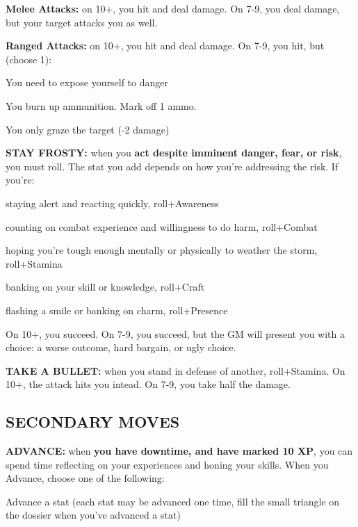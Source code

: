 \documentclass[oneside,10pt]{article}
\begin{document}
\begin{multicols}{2}
\begin{adjustwidth*}{.5cm}{.5cm}
\textbf{Melee Attacks:} on 10+, you hit and deal damage. On 7-9,
you deal damage, but your target attacks you as
well.

\textbf{Ranged Attacks:} on 10+, you hit and deal damage. On
7-9, you hit, but (choose 1):
\begin{adjustwidth*}{.5cm}{.5cm}

\tcirc{} You need to expose yourself to danger

\tcirc{} You burn up ammunition. Mark off 1 ammo.

\tcirc{} You only graze the target (-2 damage)
\end{adjustwidth*}
\end{adjustwidth*}

\textbf{STAY FROSTY:} when you \textbf{act despite imminent danger,
fear, or risk}, you must roll. The stat you add depends on
how you’re addressing the risk. If you’re:
\begin{adjustwidth*}{.5cm}{.5cm}

\tcirc{} staying alert and reacting quickly,
roll+Awareness

\tcirc{} counting on combat experience and willingness to do
harm, roll+Combat

\tcirc{} hoping you’re tough enough mentally or physically to
weather the storm, roll+Stamina

\tcirc{} banking on your skill or knowledge,
roll+Craft

\tcirc{} flashing a smile or banking on charm,
roll+Presence
\end{adjustwidth*}

On 10+, you succeed. On 7-9, you succeed, but the GM will
present you with a choice: a worse outcome, hard bargain,
or ugly choice.

\textbf{TAKE A BULLET:} when you stand in defense of another,
roll+Stamina. On 10+, the attack hits you intead. On 7-9, you
take half the damage.

\subsection{SECONDARY MOVES}

\textbf{ADVANCE:} when \textbf{you have downtime, and have marked
10 XP}, you can spend time reflecting on your experiences
and honing your skills. When you Advance, choose one of
the following:
\begin{adjustwidth*}{.5cm}{.5cm}

\tcirc{} Advance a stat (each stat may be advanced one time,
fill the small triangle on the dossier when you’ve
advanced a stat)


\end{adjustwidth*}
\end{multicols}
\end{document}
